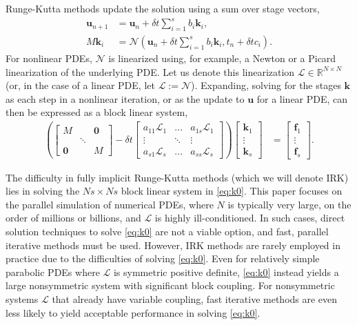 \documentclass[a4paper,10pt]{article}
\begin{document}
Runge-Kutta methods update the solution using a sum over stage vectors,
%
\begin{align*}
\mathbf{u}_{n+1} & = \mathbf{u}_n + \delta t \sum_{i=1}^s b_i\mathbf{k}_i, \\
M\mathbf{k}_i & = \mathcal{N}\left(\mathbf{u}_n + \delta t\sum_{i=1}^s b_i\mathbf{k}_i, t_n+\delta tc_i\right).
\end{align*}
%
For nonlinear PDEs, $\mathcal{N}$ is linearized using, for example, a Newton or a Picard
linearization of the underlying PDE. Let us denote this linearization $\mathcal{L}\in\mathbb{R}^{N\times N}$
(or, in the case of a linear PDE, let $\mathcal{L} := \mathcal{N}$).
Expanding, solving for the stages $\mathbf{k}$ as each step in a nonlinear iteration, or
as the update to $\mathbf{u}$ for a linear PDE, can then be expressed as a block linear system,
%
\begin{align}\label{eq:k0}
\left( \begin{bmatrix} M  & & \mathbf{0} \\ & \ddots \\ \mathbf{0} & & M\end{bmatrix}
	- \delta t \begin{bmatrix} a_{11}\mathcal{L}_1 & ... & a_{1s}\mathcal{L}_1 \\
	\vdots & \ddots & \vdots \\ a_{s1}\mathcal{L}_s & ... & a_{ss} \mathcal{L}_s \end{bmatrix} \right)
	\begin{bmatrix} \mathbf{k}_1 \\ \vdots \\ \mathbf{k}_s \end{bmatrix} 
& = \begin{bmatrix} \mathbf{f}_1 \\ \vdots \\ \mathbf{f}_s \end{bmatrix}.
\end{align}
%

The difficulty in fully implicit Runge-Kutta methods (which we will denote IRK) lies in
solving the $Ns\times Ns$ block linear system in \eqref{eq:k0}. This paper focuses on the
parallel simulation of numerical PDEs, where $N$ is typically very large, on the order of
millions or billions, and $\mathcal{L}$ is highly ill-conditioned. In such cases, direct
solution techniques to solve \eqref{eq:k0} are not a viable option, and fast, parallel 
iterative methods must be used. However, IRK methods are rarely employed in practice due
to the difficulties of solving \eqref{eq:k0}. Even for relatively simple
parabolic PDEs where $\mathcal{L}$ is symmetric positive definite, \eqref{eq:k0}
instead yields a large nonsymmetric system with significant block coupling. For
nonsymmetric systems $\mathcal{L}$ that already have variable coupling, fast iterative
methods are even less likely to yield acceptable performance in solving \eqref{eq:k0}.
\end{document}
